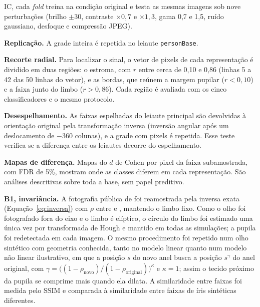 \begin{alineas}
  IC, cada \emph{fold} treina na condição original e testa as mesmas imagens
  sob nove perturbações (brilho $\pm30$, contraste $\times0{,}7$ e
  $\times1{,}3$, gama 0,7 e 1,5, ruído gaussiano, desfoque e compressão
  JPEG).
  \item \textbf{Replicação.} A grade inteira é repetida no leiaute
  \texttt{personBase}.
  \item \textbf{Recorte radial.} Para localizar o sinal, o vetor de pixels de
  cada representação é dividido em duas regiões: o estroma, com $r$ entre
  cerca de 0,10 e 0,86 (linhas 5 a 42 das 50 linhas do vetor), e as bordas,
  que reúnem a margem pupilar ($r<0{,}10$) e a faixa junto do limbo
  ($r>0{,}86$). Cada região é avaliada com os cinco classificadores e o mesmo
  protocolo.
  \item \textbf{Desespelhamento.} As faixas espelhadas do leiaute principal
  são devolvidas à orientação original pela transformação inversa (inversão
  angular após um deslocamento de $-360$ colunas), e a grade com pixels é
  repetida. Esse teste verifica se a diferença entre os leiautes decorre do
  espelhamento.
  \item \textbf{Mapas de diferença.} Mapas do $d$ de Cohen por pixel da faixa
  subamostrada, com FDR de 5\%, mostram onde as classes diferem em cada
  representação. São análises descritivas sobre toda a base, sem papel
  preditivo.
\end{alineas}

\label{sec:metodos-pupila}

\textbf{B1, invariância.} A fotografia pública de \citet{Novak2005} foi
reamostrada pela inversa exata (Equação~\ref{eq:inversa}) com $\rho$ entre
 e , mantendo o limbo fixo. Como o olho foi
fotografado fora do eixo e o limbo é elíptico, o círculo do limbo foi
estimado uma única vez por transformada de Hough \citep*{DudaHart1972} e
mantido em todas as simulações; a pupila foi redetectada em cada imagem. O
mesmo procedimento foi repetido num olho sintético com geometria conhecida,
tanto no modelo linear quanto num modelo não linear ilustrativo, em que a
posição $s$ do novo anel busca a posição $s^{\gamma}$ do anel original, com
$\gamma=\big((1-\rho_{\text{novo}})/(1-\rho_{\text{original}})\big)^{\kappa}$ e
$\kappa=1$; assim o tecido próximo da pupila se comprime mais quando ela
dilata. A similaridade entre faixas foi medida pelo SSIM \citep*{Wang2004} e
comparada à similaridade entre faixas de íris sintéticas diferentes.

